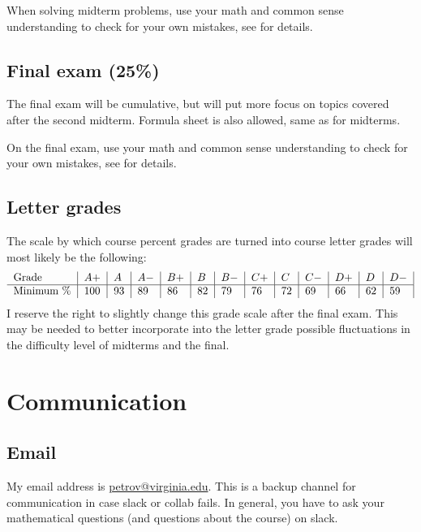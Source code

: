 \documentclass[oneside,11pt]{amsart}
\begin{document}
When solving midterm problems, use your math and common sense understanding to check for your own mistakes,
see  for details.


\subsection{Final exam (25\%)}

The final exam will be cumulative, but will put more focus 
on topics covered after the second midterm.
Formula sheet is also allowed, same as for midterms.

On the final exam, use your math and common sense understanding to check for your own mistakes,
see  for details.


\subsection*{Letter grades}

The scale by which course percent grades are turned into course letter grades
will most likely be the following:
\begin{equation*}
	\begin{tabular}{l|l|l|l|l|l|l|l|l|l|l|l|l|}
		Grade      & $ A+	$ & $A	$ & $A-	$ & $B+	$ & $B	$ & $B-	$ & $C+	$ & $C	$ & $C-	$ & $D+	$ & $D	$ & $D-$ \\
		\hline
		Minimum \% & 100     & 93   & 89    & 86    & 82    & 79    & 76    & 72    & 69    & 66    & 62    & 59
	\end{tabular}
\end{equation*}
I reserve the right to slightly change this grade scale after the
final exam.
This may be needed
to better incorporate into the letter grade
possible fluctuations in the difficulty level of 
midterms and the final.

\section{Communication}
\label{comm}

\subsection{Email}
\label{sub:email}

My email address is \href{mailto:petrov@virginia.edu}{petrov@virginia.edu}.
This is a backup channel for communication in case slack or collab fails.
In general, you have to
ask your mathematical questions (and questions about the course) on slack.
\end{document}
